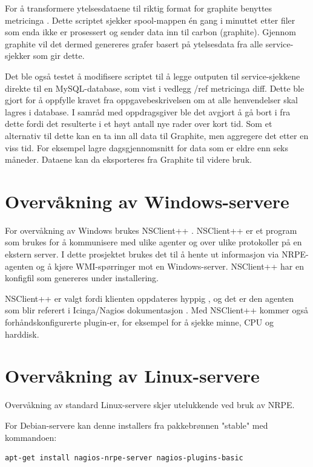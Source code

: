 For å transformere ytelsesdataene til riktig format for graphite benyttes metricinga \cite{metricinga}. Dette scriptet sjekker spool-mappen én gang i minuttet etter filer som enda ikke er prosessert og sender data inn til carbon (graphite). 
Gjennom graphite vil det dermed genereres grafer basert på ytelsesdata fra alle service-sjekker som gir dette.

Det ble også testet å modifisere scriptet til å legge outputen til service-sjekkene direkte til en MySQL-database, som vist i vedlegg /ref metricinga diff. Dette ble gjort for å oppfylle kravet fra oppgavebeskrivelsen om at alle henvendelser skal lagres i database. I samråd med oppdragsgiver ble det avgjort å gå bort i fra dette fordi det resulterte i et høyt antall nye rader over kort tid. Som et alternativ til dette kan en ta inn all data til Graphite, men aggregere det etter en viss tid. For eksempel lagre dagsgjennomsnitt for data som er eldre enn seks måneder. Dataene kan da eksporteres fra Graphite til videre bruk.

\section{Overvåkning av Windows-servere}
For overvåkning av Windows brukes NSClient++ \cite{nsclientmain}. NSClient++ er et program som brukes for å kommunisere med ulike agenter og over ulike protokoller på en ekstern server. I dette prosjektet brukes det til å hente ut informasjon via NRPE-agenten og å kjøre WMI-spørringer mot en Windows-server. NSClient++ har en konfigfil som genereres under installering. 

NSClient++ er valgt fordi klienten oppdateres hyppig \cite{nsclient}, og det er den agenten som blir referert i Icinga/Nagios dokumentasjon \cite{icingawin}. Med NSClient++ kommer også forhåndskonfigurerte plugin-er, for eksempel for å sjekke minne, CPU og harddisk.

\section{Overvåkning av Linux-servere}\label{sec:overvaklinux}
Overvåkning av standard Linux-servere skjer utelukkende ved bruk av NRPE. 

For Debian-servere kan denne installers fra pakkebrønnen "stable" med kommandoen:

\begin{lstlisting}[style=example]
apt-get install nagios-nrpe-server nagios-plugins-basic
\end{lstlisting}

